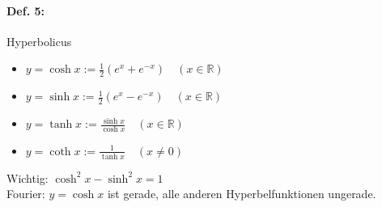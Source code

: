 \paragraph{Def. 5:}Hyperbolicus
\begin{itemize}
\item $y=\cosh x := \frac{1}{2}(e^x+e^{-x}) \quad  (x \in \mathbb{R})$
\item $y=\sinh x := \frac{1}{2}(e^x-e^{-x}) \quad  (x \in \mathbb{R})$
\item $y=\tanh x := \frac{\sinh x}{\cosh x} \quad  (x \in \mathbb{R})$
\item $y=\coth x := \frac{1}{\tanh x} \quad  (x \not = 0)$
\end{itemize}
Wichtig: $\cosh^2 x-\sinh^2 x = 1$\\
Fourier: $y=\cosh x$ ist gerade, alle anderen Hyperbelfunktionen ungerade.
